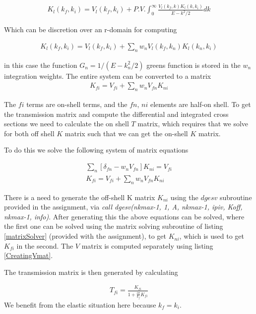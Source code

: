 \documentclass{article}
\begin{document}
   	\begin{gather}
   		K_l(k_f,k_i) = V_l(k_f,k_i) + P.V. \int_{0}^{\infty}\frac{V_l(k_f,k)K_l(k,k_i)}{E - k^2/2}dk
   	\end{gather}
   	
   	Which can be discretion over an r-domain for computing
   	
   	\begin{gather}
        K_l(k_f,k_i) = V_l(k_f,k_i) + \sum_{n} w_n V_l(k_f,k_n)K_l(k_n,k_i)
   	\end{gather}
   	
    in this case the function $G_n = 1/(E-k_n^2/2)$ greens function is stored in the $w_n$ integration weights. 
    The entire system can be converted to a matrix
    \begin{gather}
    	K_{fi} = V_{fi} + \sum_{n} w_n V_{fn} K_{ni}
    \end{gather}
    
    The $fi$ terms are on-shell terms, and the $fn$, $ni$ elements are half-on shell. To get the transmission matrix and compute the differential and integrated cross sections we need to calculate the on shell $T$ matrix, which requires that we solve for both off shell $K$ matrix such that we can get the on-shell $K$ matrix. 
    
    To do this we solve the following system of matrix equations
    
    \begin{gather}
    	\sum_{n}\left[ \delta_{fn} - w_n V_{fn}\right] K_{ni} = V_{fi}\\
    	K_{fi} = V_{fi} + \sum_{n} w_n V_{fn} K_{ni}
    \end{gather}
    
    There is a need to generate the off-shell K matrix $K_{ni}$ using the $dgesv$ subroutine provided in the assignment, via \textit{call dgesv(nkmax-1, 1, A, nkmax-1, ipiv, Koff, nkmax-1, info)}.
    After generating this the above equations can be solved, where the first one can be solved using the matrix solving subroutine of listing \ref{matrixSolver} (provided with the assignment), to get $K_{ni}$, which is used to get $K_{fi}$ in the second. The $V$ matrix is computed separately using listing \ref{CreatingVmat}. 
     
    
    The transmission matrix is then generated by calculating
    
    \begin{gather}
    	T_{fi} = \frac{K_{fi}}{1+\frac{i\pi}{k_f}K_{fi}}
    \end{gather}
    We benefit from the elastic situation here because $k_f = k_i$.
    
\end{document}
